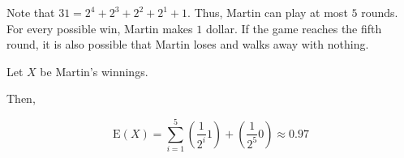 Note that $31 = 2^{4} + 2^{3} + 2^{2} + 2^{1} + 1$. Thus, Martin can play at
most $5$ rounds. For every possible win, Martin makes $1$ dollar. If the game
reaches the fifth round, it is also possible that Martin loses and walks away
with nothing.

Let $X$ be Martin's winnings.

Then,

$$\text{E}(X) = \sum_{i=1}^{5}(\frac{1}{2^{i}} 1) + (\frac{1}{2^{5}}
0) \approx 0.97$$  